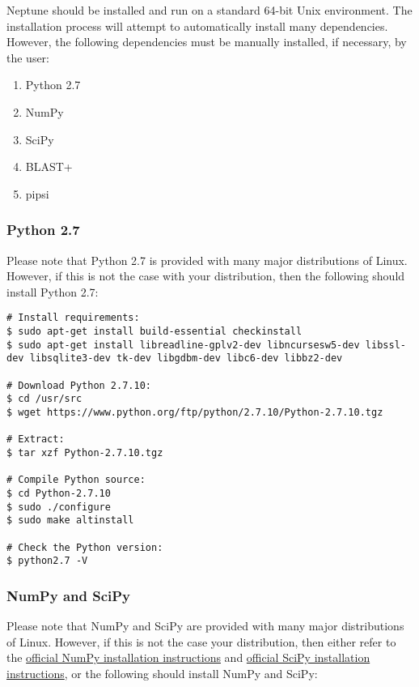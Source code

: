 \documentclass[a4paper,10pt]{article}
\begin{document}
Neptune should be installed and run on a standard 64-bit Unix environment. The installation process will attempt to automatically install many dependencies. However, the following dependencies must be manually installed, if necessary, by the user:

\begin{enumerate}
  \item Python 2.7
  \item NumPy
  \item SciPy
  \item BLAST+
  \item pipsi
\end{enumerate}

\subsubsection{Python 2.7}

Please note that Python 2.7 is provided with many major distributions of Linux. However, if this is not the case with your distribution, then the following should install Python 2.7:

\begin{lstlisting}
# Install requirements:
$ sudo apt-get install build-essential checkinstall
$ sudo apt-get install libreadline-gplv2-dev libncursesw5-dev libssl-dev libsqlite3-dev tk-dev libgdbm-dev libc6-dev libbz2-dev

# Download Python 2.7.10:
$ cd /usr/src
$ wget https://www.python.org/ftp/python/2.7.10/Python-2.7.10.tgz

# Extract:
$ tar xzf Python-2.7.10.tgz

# Compile Python source:
$ cd Python-2.7.10
$ sudo ./configure
$ sudo make altinstall

# Check the Python version:
$ python2.7 -V
\end{lstlisting}

\subsubsection{NumPy and SciPy}

Please note that NumPy and SciPy are provided with many major distributions of Linux. However, if this is not the case your distribution, then either refer to the \href{http://docs.scipy.org/doc/numpy-1.10.1/user/install.html}{official NumPy installation instructions} and \href{http://www.scipy.org/scipylib/building/linux.html}{official SciPy installation instructions}, or the following should install NumPy and SciPy:
\end{document}
